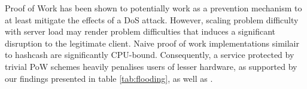 Proof of Work has been shown to potentially work as a prevention mechanism to at least mitigate the effects of a DoS attack\cite{JuelsB99}. However, scaling problem difficulty with server load may render problem difficulties that induces a significant disruption to the legitimate client. Naive proof of work implementations similair to hashcash are significantly CPU-bound\cite{hashcashbench}. Consequently, a service protected by trivial PoW schemes heavily penalises users of lesser hardware, as supported by our findings presented in table \ref{tab:flooding}, as well as \citeauthor{Tsang2008}\cite{Tsang2008}.

\begin{comment}
Proof of Work has been shown to potentially work as a prevention mechanism to at least mitigate the effects of a DoS attack without making an as assumption about the source.[källa] However, \citeauthor{LaurieC04} concluded in the paper \citetitle{LaurieC04}, that PoW on it's own, is not a feasible solution to fighting spam and denial of service attacks. This is because the classical implementation of Proof of Work does not seperate legitimate users from attackers. Hence, problems from a Proof of Work protected system would not discourage abusers of the system without having an unacceptable effect on legitimate users. 
\end{comment}